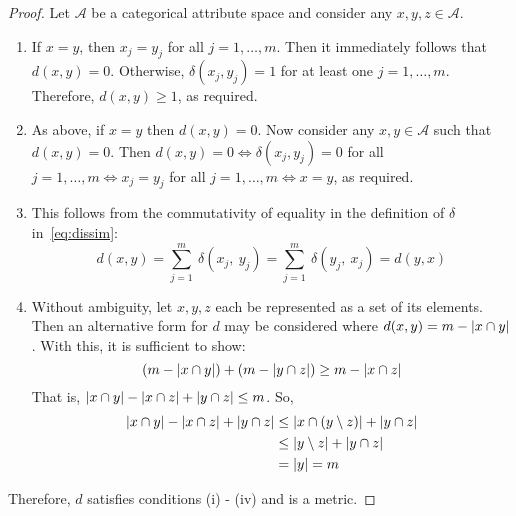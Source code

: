 \begin{proof}
    Let \(\mathcal A\) be a categorical attribute space and consider any
    \(x,y,z \in \mathcal A\).
    \begin{enumerate}[label=(\roman*)]
        \item If \(x = y\), then \(x_j = y_j\) for all \(j = 1, \ldots, m\).
            Then it immediately follows that \(d(x,y) = 0\). Otherwise,
            \(\delta\left(x_j, y_j\right) = 1\) for at least one
            \(j = 1, \ldots, m\). Therefore, \(d(x, y) \geq 1\), as required.
        \item As above, if \(x = y\) then \(d(x, y) = 0\). Now consider any
            \(x, y \in \mathcal A\) such that \(d(x, y) = 0\). Then
            \(d(x, y) = 0 \iff \delta\left(x_j, y_j\right) = 0\) for all
            \(j = 1, \ldots, m \iff x_j = y_j\) for all
            \(j = 1, \ldots, m \iff x = y\), as required.
        \item This follows from the commutativity of equality in the definition
            of \(\delta\) in~\eqref{eq:dissim}:
            \[
                d(x, y) = \sum_{j=1}^{m}~\delta\left(x_j,~y_j\right)
                = \sum_{j=1}^{m}~\delta\left(y_j,~x_j\right)
                = d(y, x)
            \]
        \item Without ambiguity, let \(x, y, z\) each be represented as a set of
            its elements. Then an alternative form for \(d\) may be considered
            where \(d(x, y) = m - \abs*{x \cap y}\). With this, it is sufficient
            to show:
            \[
                \left(m - \abs*{x \cap y}\right)
                + \left(m - \abs*{y \cap z}\right)
                \geq m - \abs*{x \cap z}
            \]
            That is,
            \(\abs*{x \cap y} - \abs*{x \cap z} + \abs*{y \cap z} \leq m\). So,
            \[
                \begin{aligned}
                    \abs*{x \cap y} - \abs*{x \cap z} + \abs*{y \cap z}
                    & \leq
                    \abs*{x \cap \left(y \setminus z\right)} + \abs*{y \cap z}\\
                    & \leq
                    \abs*{y \setminus z} + \abs*{y \cap z}\\
                    & = \abs*{y} = m
                \end{aligned}
            \]
    \end{enumerate}

    Therefore, \(d\) satisfies conditions (i) \-- (iv) and is a metric.
\end{proof}
